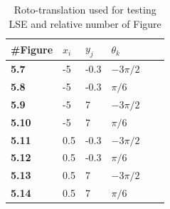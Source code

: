 \documentclass[a4paper, onecolumn]{report}
\begin{document}
\begin{center}
\begin{table}
    \begin{tabularx}{\textwidth}{@{}lYYYYY@{}}
  \hline
\textbf{\#Figure} & \textbf{$x_i$} & \textbf{$y_j$} & \textbf{$\theta_k$}\\ \hline
\textbf{5.7} & -5 & -0.3 & $-3\pi/2$ \\ \hline
\textbf{5.8} & -5 & -0.3 & $\pi/6$ \\ \hline
\textbf{5.9} & -5 & 7 & $-3\pi/2$ \\ \hline
\textbf{5.10} & -5 & 7 & $\pi/6$ \\ \hline
\textbf{5.11} & 0.5 & -0.3 & $-3\pi/2$ \\ \hline
\textbf{5.12} & 0.5 & -0.3 & $\pi/6$ \\ \hline
\textbf{5.13} & 0.5 & 7 & $-3\pi/2$ \\ \hline
\textbf{5.14} & 0.5 & 7 & $\pi/6$ \\ \hline
   \hline
    \end{tabularx}
\caption{Roto-translation used for testing LSE and relative number of Figure}
\end{table}
\end{center}
\end{document}
